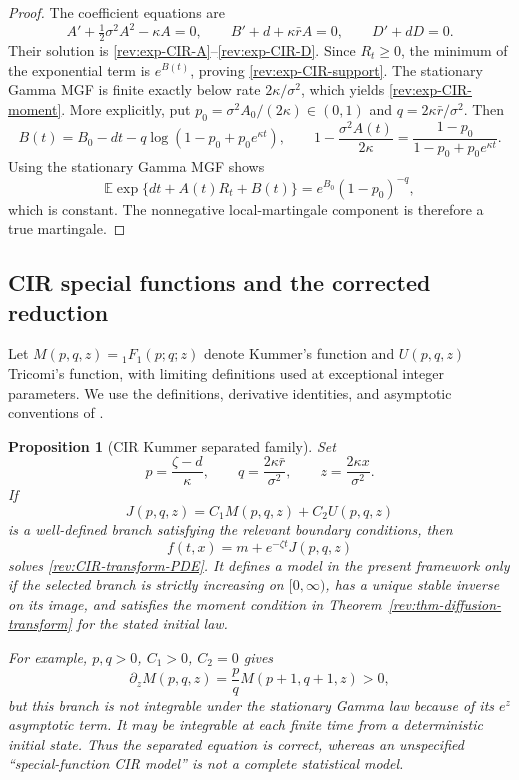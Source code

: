 \documentclass[11pt]{article}
\newtheorem{proposition}[definition]{Proposition}
\theoremstyle{remark}
\newcommand{\E}{\mathbb E}
\begin{document}
\begin{proof}
The coefficient equations are
\[
A'+\tfrac12\sigma^2A^2-\kappa A=0,
\qquad B'+d+\kappa\bar r A=0,
\qquad D'+dD=0.
\]
Their solution is \eqref{rev:exp-CIR-A}--\eqref{rev:exp-CIR-D}.  Since
$R_t\ge0$, the minimum of the exponential term is $e^{B(t)}$, proving
\eqref{rev:exp-CIR-support}.  The stationary Gamma MGF is finite exactly below
rate $2\kappa/\sigma^2$, which yields \eqref{rev:exp-CIR-moment}.  More
explicitly, put $p_0=\sigma^2A_0/(2\kappa)\in(0,1)$ and
$q=2\kappa\bar r/\sigma^2$.  Then
\[
B(t)=B_0-dt-q\log(1-p_0+p_0e^{\kappa t}),
\qquad
1-\frac{\sigma^2A(t)}{2\kappa}
=\frac{1-p_0}{1-p_0+p_0e^{\kappa t}}.
\]
Using the stationary Gamma MGF shows
\[
\E\exp\{dt+A(t)R_t+B(t)\}=e^{B_0}(1-p_0)^{-q},
\]
which is constant.  The nonnegative local-martingale component is therefore a
true martingale.
\end{proof}

\subsection{CIR special functions and the corrected reduction}

Let $M(p,q,z)={}_1F_1(p;q;z)$ denote Kummer's function and $U(p,q,z)$
Tricomi's function, with limiting definitions used at exceptional integer
parameters.  We use the definitions, derivative identities, and asymptotic
conventions of \citet[Chapter~13]{OlverEtAl2010}.

\begin{proposition}[CIR Kummer separated family]
\label{rev:prop-CIR-Kummer}
Set
\begin{equation}
p=\frac{\zeta-d}{\kappa},\qquad
q=\frac{2\kappa\bar r}{\sigma^2},\qquad
z=\frac{2\kappa x}{\sigma^2}.
\label{rev:CIR-Kummer-parameters}
\end{equation}
If
\begin{equation}
J(p,q,z)=C_1M(p,q,z)+C_2U(p,q,z)
\label{rev:CIR-Kummer-branch}
\end{equation}
is a well-defined branch satisfying the relevant boundary conditions, then
\begin{equation}
f(t,x)=m+e^{-\zeta t}J(p,q,z)
\label{rev:CIR-Kummer-transform}
\end{equation}
solves \eqref{rev:CIR-transform-PDE}.  It defines a model in the present
framework only if the selected branch is strictly increasing on $[0,\infty)$,
has a unique stable inverse on its image, and satisfies the moment condition in
Theorem~\ref{rev:thm-diffusion-transform} for the stated initial law.

For example, $p,q>0$, $C_1>0$, $C_2=0$ gives
\begin{equation}
\partial_zM(p,q,z)=\frac pqM(p+1,q+1,z)>0,
\label{rev:Kummer-M-derivative}
\end{equation}
but this branch is not integrable under the stationary Gamma law because of its
$e^z$ asymptotic term.  It may be integrable at each finite time from a
deterministic initial state.  Thus the separated equation is correct, whereas
an unspecified ``special-function CIR model'' is not a complete statistical
model.
\end{proposition}
\end{document}
